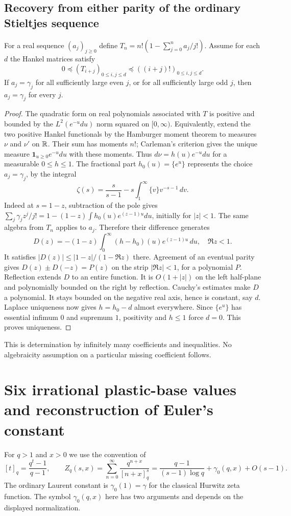 \documentclass[11pt,a4paper]{article}
\theoremstyle{definition}\newtheorem{definition}[theorem]{Definition}\newtheorem{example}[theorem]{Example}
\theoremstyle{remark}\newtheorem{remark}[theorem]{Remark}
\begin{document}
\subsection{Recovery from either parity of the ordinary Stieltjes sequence}
\begin{proposition}\label{prop:hankel}
For a real sequence $(a_j)_{j\ge0}$ define $T_n=n!(1-\sum_{j=0}^n a_j/j!)$.
Assume for each $d$ the Hankel matrices satisfy
\[
0\preceq (T_{i+j})_{0\le i,j\le d}\preceq ((i+j)!)_{0\le i,j\le d}.
\]
If $a_j=\gamma_j$ for all sufficiently large even $j$, or for all sufficiently large odd $j$, then $a_j=\gamma_j$ for every $j$.
\end{proposition}
\begin{proof}
The quadratic form on real polynomials associated with $T$ is positive and bounded by the $L^2(e^{-u}du)$ norm squared on $[0,\infty)$. Equivalently, extend the two positive Hankel functionals by the Hamburger moment theorem to measures $\nu$ and $\nu'$ on $\mathbb R$. Their sum has moments $n!$; Carleman's criterion gives the unique measure $\mathbf1_{u\ge0}e^{-u}du$ with these moments. Thus $d\nu=h(u)e^{-u}du$ for a measurable $0\le h\le1$. The fractional part $h_0(u)=\{e^u\}$ represents the choice $a_j=\gamma_j$, by the integral
\[
\zeta(s)=\frac{s}{s-1}-s\int_1^\infty \{v\}v^{-s-1}\,dv.
\]
Indeed at $s=1-z$, subtraction of the pole gives $\sum_j\gamma_j z^j/j!=1-(1-z)\int h_0(u)e^{(z-1)u}du$, initially for $|z|<1$. The same algebra from $T_n$ applies to $a_j$. Therefore their difference generates
\[
D(z)=-(1-z)\int_0^\infty(h-h_0)(u)e^{(z-1)u}\,du,\quad \Re z<1 .
\]
It satisfies $|D(z)|\le |1-z|/(1-\Re z)$ there. Agreement of an eventual parity gives $D(z)\pm D(-z)=P(z)$ on the strip $|\Re z|<1$, for a polynomial $P$. Reflection extends $D$ to an entire function. It is $O(1+|z|)$ on the left half-plane and polynomially bounded on the right by reflection. Cauchy's estimates make $D$ a polynomial. It stays bounded on the negative real axis, hence is constant, say $d$. Laplace uniqueness now gives $h=h_0-d$ almost everywhere. Since $\{e^u\}$ has essential infimum $0$ and supremum $1$, positivity and $h\le1$ force $d=0$. This proves uniqueness.
\end{proof}
This is determination by infinitely many coefficients and inequalities. No algebraicity assumption on a particular missing coefficient follows.
\section{Six irrational plastic-base values and reconstruction of Euler's constant}
\label{sec:plastic}
For $q>1$ and $x>0$ we use the convention of \cite{qZeta}
\[
 [t]_q=\frac{q^t-1}{q-1},\qquad
 Z_q(s,x)=\sum_{n=0}^\infty\frac{q^{n+x}}{[n+x]_q^s}
 =\frac{q-1}{(s-1)\log q}+\gamma_0(q,x)+O(s-1).
\]
The ordinary Laurent constant is $\gamma_0(1)=\gamma$ for the classical Hurwitz zeta function. The symbol $\gamma_0(q,x)$ here has two arguments and depends on the displayed normalization.
\end{document}
